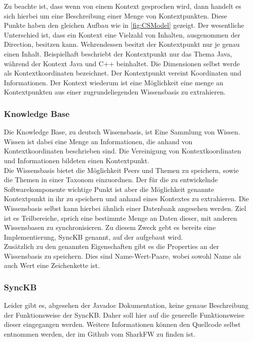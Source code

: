 \documentclass[a4paper]{article}
\begin{document}
	Zu beachte ist, dass wenn von einem Kontext gesprochen wird, dann handelt es
	sich hierbei um eine Beschreibung einer Menge von Kontextpunkten. Diese
	Punkte haben den gleichen Aufbau wie in \autoref{fig:CSModel} gezeigt. Der 
	wesentliche Unterschied ist, dass ein Kontext eine Vielzahl von Inhalten,
	ausgenommen der Direction, besitzen kann. Wehrendessen besitzt der
	Kontextpunkt nur je genau einen Inhalt. Beispielhaft beschriebt der
	Kontextpunkt nur das Thema Java, während der Kontext Java und C++ beinhaltet.
	Die Dimensionen selbst werde als Kontextkoordinaten bezeichnet. Der 
	Kontextpunkt vereint Koordinaten und Informationen. Der Kontext wiederum
	ist eine Möglichkeit eine menge an Kontextpunkten aus einer zugrundeliegenden
	Wissensbasis zu extrahieren.
	
	\subsubsection{Knowledge Base} 
	Die Knowledge Base, zu deutsch Wissensbasis, ist Eine Sammlung von Wissen.
	Wissen ist dabei eine Menge an Informationen, die anhand von
	Kontextkoordinaten beschrieben sind. Die Vereinigung von Kontextkoordinaten
	und Informationen bildeten einen Kontextpunkt.\\
	
	Die Wissensbasis bietet die Möglichkeit Peers und Themen zu speichern, sowie
	die Themen in einer Taxonom einzuordnen. Der für die zu entwickelnde
	Softwarekomponente wichtige Punkt ist aber die Möglichkeit genannte
	Kontextpunkt in ihr zu speichern und anhand eines Kontextes zu extrahieren.
	Die Wissensbasis selbst kann hierbei ähnlich einer Datenbank angesehen werden.
	Ziel ist es Teilbereiche, sprich eine bestimmte Menge an Daten dieser, mit
	anderen Wissensbasen zu synchronisieren. Zu diesem Zweck gebt es bereits eine
	Implementierung, SyncKB genannt, auf der aufgebaut wird. \\
	
	Zusätzlich zu den genannten Eigenschaften gibt es die Properties an der
	Wissensbasis zu speichern. Dies sind Name-Wert-Paare, wobei sowohl Name 
	als auch Wert eine Zeichenkette ist.
	
	\subsubsection{SyncKB} 
	
	Leider gibt es, abgesehen der Javadoc Dokumentation, keine genaue
	Beschreibung der Funktionsweise der SyncKB. Daher soll hier auf die
	generelle Funktionsweise dieser eingegangen werden. Weitere Informationen
	können den Quellcode selbst entnommen werden, der im Github vom SharkFW
	zu finden ist. \cite{SyncKB}
	
\end{document}
